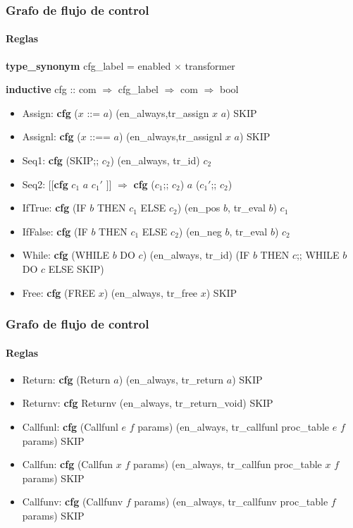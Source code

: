 \begin{frame}[fragile]
\frametitle{Grafo de flujo de control}
\framesubtitle{Reglas}

\textbf{type\_synonym} cfg\_label = enabled $\times$ transformer

\bigskip

\textbf{inductive} cfg :: com $\Rightarrow$ cfg\_label $\Rightarrow$ com $\Rightarrow$ bool

\begin{itemize}
\item{Assign: \textbf{cfg} ($x$ ::= $a$) (en\_always,tr\_assign $x$ $a$) SKIP}
\item{Assignl: \textbf{cfg} ($x$ ::==  $a$) (en\_always,tr\_assignl $x$ $a$) SKIP}
\item{Seq1: \textbf{cfg} (SKIP;; $c_{2}$) (en\_always, tr\_id) $c_{2}$}
\item{Seq2: $[\![$\textbf{cfg} $c_{1}$ $a$ $c_{1}'$ $]\!]$ $\Longrightarrow$ \textbf{cfg} ($c_{1}$;; $c_{2}$) $a$ ($c_{1}'$;; $c_{2}$)}
\item{IfTrue: \textbf{cfg} (IF $b$ THEN $c_{1}$ ELSE $c_{2}$) (en\_pos $b$, tr\_eval $b$) $c_{1}$}
\item{IfFalse: \textbf{cfg} (IF $b$ THEN $c_{1}$ ELSE $c_{2}$) (en\_neg $b$, tr\_eval $b$) $c_{2}$}
\item{While: \textbf{cfg} (WHILE $b$ DO $c$) (en\_always, tr\_id)
  (IF $b$ THEN $c$;; WHILE $b$ DO $c$ ELSE SKIP)}
\item{Free: \textbf{cfg} (FREE $x$) (en\_always, tr\_free $x$) SKIP}
\end{itemize}

\end{frame}


\begin{frame}[fragile]
\frametitle{Grafo de flujo de control}
\framesubtitle{Reglas}

\begin{itemize}
\item{Return: \textbf{cfg} (Return $a$) (en\_always, tr\_return $a$) SKIP}
\item{Returnv: \textbf{cfg} Returnv (en\_always, tr\_return\_void) SKIP}

\item{Callfunl: \textbf{cfg} (Callfunl $e$ $f$ params)
  (en\_always, tr\_callfunl proc\_table $e$ $f$ params) SKIP}
\item{Callfun: \textbf{cfg} (Callfun $x$ $f$ params)
  (en\_always, tr\_callfun proc\_table $x$ $f$ params) SKIP}
\item{Callfunv: \textbf{cfg} (Callfunv $f$ params)
  (en\_always, tr\_callfunv proc\_table $f$ params) SKIP}
\end{itemize}

\end{frame}


